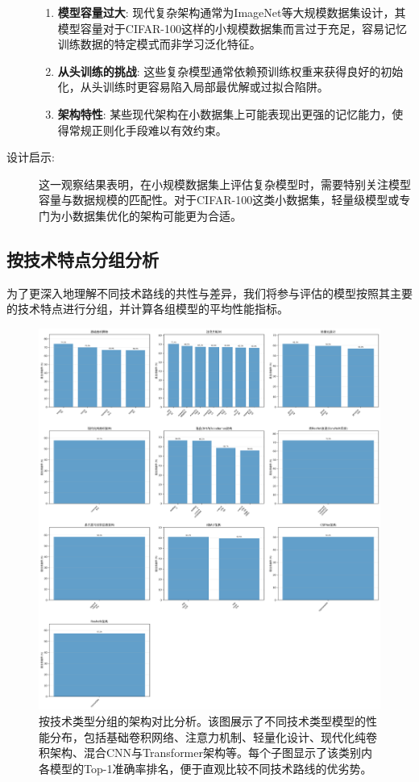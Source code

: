 \documentclass[a4paper]{article}
\begin{document}
\begin{description}
\begin{enumerate}
        \item \textbf{模型容量过大}: 现代复杂架构通常为ImageNet等大规模数据集设计，其模型容量对于CIFAR-100这样的小规模数据集而言过于充足，容易记忆训练数据的特定模式而非学习泛化特征。
        \item \textbf{从头训练的挑战}: 这些复杂模型通常依赖预训练权重来获得良好的初始化，从头训练时更容易陷入局部最优解或过拟合陷阱。
        \item \textbf{架构特性}: 某些现代架构在小数据集上可能表现出更强的记忆能力，使得常规正则化手段难以有效约束。
    \end{enumerate}
    \item[设计启示:] 这一观察结果表明，在小规模数据集上评估复杂模型时，需要特别关注模型容量与数据规模的匹配性。对于CIFAR-100这类小数据集，轻量级模型或专门为小数据集优化的架构可能更为合适。
\end{description}

\subsection{按技术特点分组分析}
为了更深入地理解不同技术路线的共性与差异，我们将参与评估的模型按照其主要的技术特点进行分组，并计算各组模型的平均性能指标。

\begin{figure}[H]
    \centering
    \includegraphics[width=\textwidth]{fig/architecture_comparison.png}
    \caption{按技术类型分组的架构对比分析。该图展示了不同技术类型模型的性能分布，包括基础卷积网络、注意力机制、轻量化设计、现代化纯卷积架构、混合CNN与Transformer架构等。每个子图显示了该类别内各模型的Top-1准确率排名，便于直观比较不同技术路线的优劣势。}
    \label{fig:architecture_comparison}
\end{figure}
\end{document}
